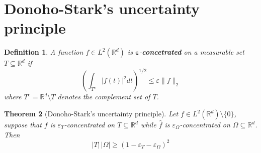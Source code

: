 \documentclass[corpo=11pt, stile=classica, tipotesi=custom,
greek, evenboxes, english]{toptesi}
\numberwithin{equation}{chapter}
\newtheorem{teo}{Theorem}[chapter] %
\newtheorem{defi}[teo]{Definition}
\newcommand{\R}{\mathbb{R}} %
\begin{document}
\section{Donoho-Stark's uncertainty principle}\label{section Donoho-Stark's UP}
\begin{defi}\label{epsilon-concetrated def}
	A function $f \in L^2(\R^d)$ is $\mathbf{\varepsilon}$-\textbf{concetrated} on a measurable set $T \subseteq \R^d$ if
	\begin{equation*}
		\left(\int_{T^c} |f(t)|^2 dt \right)^{1/2} \leq \varepsilon \| f \|_2
	\end{equation*}
	where $T^c = \R^d \setminus T$ denotes the complement set of $T$.
\end{defi}
\begin{teo}[Donoho-Stark's uncertainty principle]\label{Donoho-Stark's uncertainty principle theorem}
	Let $f \in L^2(\R^d) \setminus \{0\}$, suppose that $f$ is $\varepsilon_T$-concentrated on $T \subseteq \R^d$ while $\hat{f}$ is $\varepsilon_{\Omega}$-concentrated on $\Omega \subseteq \R^d$. Then
	\begin{equation}\label{Donoho-Stark's uncertainty principle formula}
		|T| \, |\Omega| \geq (1 - \varepsilon_T - \varepsilon_{\Omega})^2
	\end{equation}
\end{teo}
\end{document}
